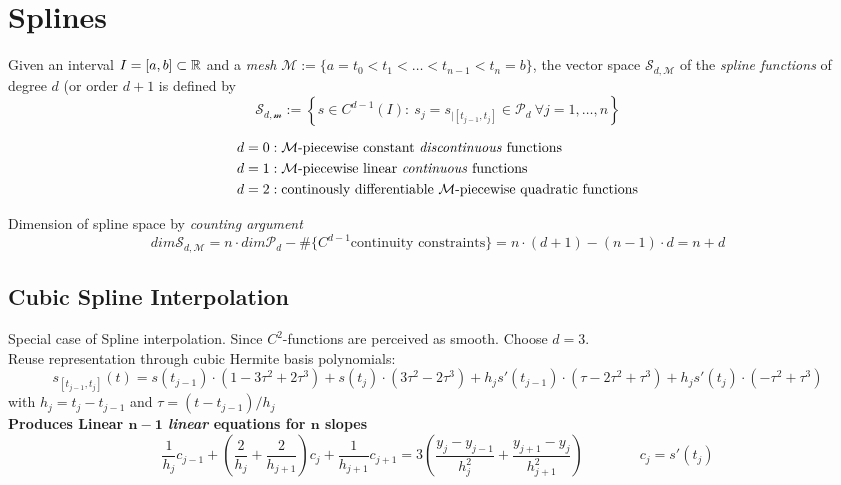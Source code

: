 \section{Splines}
	\begin{definition}
	 Given an interval $I=[a,b] \subset \mathbb{R}$ and a \emph{mesh} $\mathcal{M}:= \{a = t_0 <t_1 < \ldots < t_{n-1} < t_n = b\}$, the vector space $\mathcal S_{d,\mathcal M}$ of the \emph{spline functions} of degree $d$ (or order $d+1$ is defined by
	 \[
	  \mathcal S_{d,\mathcal m} := \left\{ s \in C^{d-1}(I):\ s_j = s_{|[t_{j-1},t_j]} \in \mathcal P_d \ \forall j = 1,\ldots, n\right\}
	 \]
	\end{definition}
	\begin{align*}
	 d=0 &:\text{$\mathcal M$-piecewise constant \emph{discontinuous} functions}\\
	 d=1 &:\text{$\mathcal M$-piecewise linear \emph{continuous} functions}\\
	 d=2 &:\text{continously differentiable $\mathcal M$-piecewise quadratic functions}
	\end{align*}
	\begin{fmerke} 
	 Dimension of spline space by \emph{counting argument}
	 \[
	  dim \mathcal S_{d,\mathcal M} = n \cdot dim \mathcal P_d - \#\{C^{d-1} \text{continuity constraints}\} = n\cdot (d+1) - (n-1) \cdot d = n+d
	 \]
	\end{fmerke}
	
	\subsection{Cubic Spline Interpolation}
		Special case of Spline interpolation. Since $C^2$-functions are perceived as smooth. Choose $d=3$. \\
		
		Reuse representation through cubic Hermite basis polynomials:
		\[
		 s_{[t_{j-1},t_j]}(t) = s(t_{j-1}) \cdot (1-3\tau^2+2\tau^3) +s(t_j) \cdot (3 \tau^2-2\tau^3) + h_j s'(t_{j-1})\cdot (\tau -2\tau^2+\tau^3)+h_js' (t_j)\cdot(-\tau^2 +\tau^3)
		\]
		with $h_j = t_j - t_{j-1}$ and $\tau = (t-t_{j-1})/h_j$\\
		
		\textbf{Produces Linear $\mathbf{n-1}$ \emph{linear} equations for $\mathbf n$ slopes}
		\[
		 \frac{1}{h_j} c_{j-1} + \left( \frac{2}{h_j}+ \frac{2}{h_{j+1}}\right) c_j + \frac{1}{h_{j+1}}c_{j+1} = 3 \left( \frac{y_j -y_{j-1}}{h_j^2}+\frac{y_{j+1}-y_j}{h_{j+1}^2}\right) \qquad \qquad c_j = s'(t_j)
		\]

